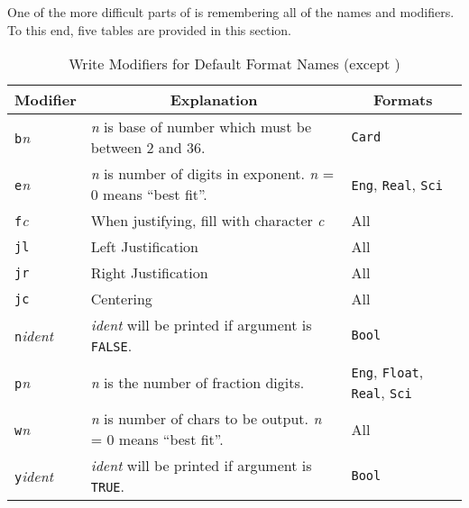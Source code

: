 One of the more difficult parts of   is remembering
all of the names and modifiers.  To this end, five tables are provided in this
section.
\begin {table}[h]
\centering
\caption{Write Modifiers for Default Format Names (except )}
\medskip
\begin{tabular}{|l|p{2in}|l|}
\hline
\multicolumn{1}{|c|}{Modifier}
&\multicolumn{1}{|c|}{Explanation}
&\multicolumn{1}{|c|}{Formats}
    \\ \hline
    {\tt b}{\em n}      
        & {\em n } is base of number which must be between 2 and 36.
        & {\tt Card}
    \\ \hline
    {\tt e}{\em n}      
        & {\em n} is number of digits in exponent.
          {\em n} = 0 means ``best fit''.
        &  {\tt Eng}, {\tt Real}, {\tt Sci}
    \\ \hline
    {\tt f}{\em c}      
        & When justifying, fill with character {\em c}
        & All
    \\ \hline
    {\tt jl}        
        & Left Justification
        & All
    \\
    {\tt jr}       
        & Right Justification    
        & All
    \\
    {\tt jc}    
        & Centering              
        & All   
    \\ \hline
    {\tt n}{\em ident}  
        & {\em ident} will be printed if argument is {\tt FALSE}.
        & {\tt Bool}
    \\ \hline
    {\tt p}{\em n}      
        & {\em n} is the number of fraction digits.
        & {\tt Eng}, {\tt Float}, {\tt Real}, {\tt Sci}
    \\ \hline
    {\tt w}{\em n}
        & {\em n} is number of chars to be output.
          {\em n} = 0 means ``best fit''.
        & All
    \\ \hline
    {\tt y}{\em ident}  
        & {\em ident} will be printed if argument is {\tt TRUE}.
        & {\tt Bool}
    \\ \hline
\end{tabular}
\end{table}

